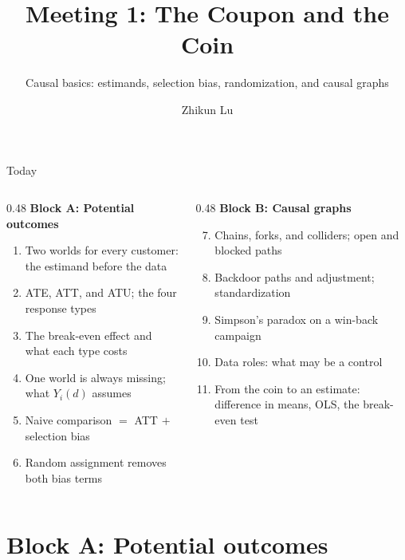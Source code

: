 \documentclass[aspectratio=169, 11pt, handout]{beamer}
\title[Meeting 1]{Meeting 1: The Coupon and the Coin}
\subtitle{Causal basics: estimands, selection bias, randomization, and causal graphs}
\author{Zhikun Lu}
\date{}
\begin{document}
\begin{frame}
\titlepage
\end{frame}

\begin{frame}{Today}

\begin{columns}[T]
\begin{column}{0.48\textwidth}
\textbf{Block A: Potential outcomes}
\begin{enumerate}
  \item Two worlds for every customer: the estimand before the data
  \item ATE, ATT, and ATU; the four response types
  \item The break-even effect and what each type costs
  \item One world is always missing; what $Y_i(d)$ assumes
  \item Naive comparison $=$ ATT $+$ selection bias
  \item Random assignment removes both bias terms
\end{enumerate}
\end{column}
\begin{column}{0.48\textwidth}
\textbf{Block B: Causal graphs}
\begin{enumerate}
  \setcounter{enumi}{6}
  \item Chains, forks, and colliders; open and blocked paths
  \item Backdoor paths and adjustment; standardization
  \item Simpson's paradox on a win-back campaign
  \item Data roles: what may be a control
  \item From the coin to an estimate: difference in means, OLS, the break-even test
\end{enumerate}
\end{column}
\end{columns}
\end{frame}

\section{Block A: Potential outcomes}
\end{document}
